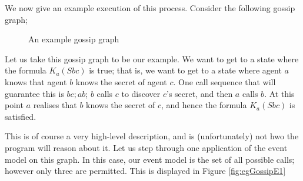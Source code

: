 \documentclass[12pt, a4paper]{article}
\begin{document}
\bigskip \bigskip \bigskip

We now give an example execution of this process. Consider the following gossip
graph;

\begin{figure}[h]
  \centering
  \caption{An example gossip graph}
  \label{fig:egGossip}
\end{figure}

Let us take this gossip graph to be our example. We want to get to a state where
the formula $K_a (Sbc)$ is true; that is, we want to get to a state where agent
$a$ knows that agent $b$ knows the secret of agent $c$. One call sequence that
will guarantee this is $bc; ab$; $b$ calls $c$ to discover $c$'s secret, and
then $a$ calls $b$. At this point $a$ realises that $b$ knows the secret of $c$,
and hence the formula $K_a (Sbc)$ is satisfied.

This is of course a very high-level description, and is (unfortunately) not hwo
the program will reason about it. Let us step through one application of the
event model  on this graph. In this case, our event model  is the
set of all possible calls; however only three are permitted. This is displayed
in Figure \ref{fig:egGossipE1}
\end{document}
